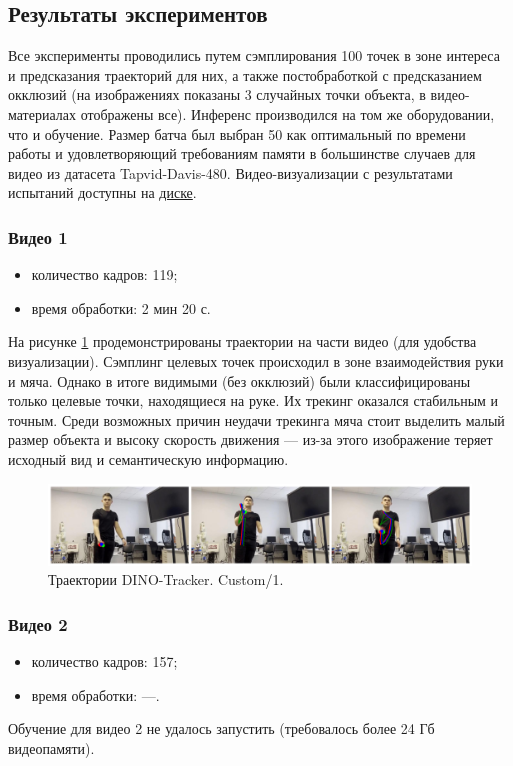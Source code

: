 \documentclass[a4paper, 14pt]{extarticle}
\theoremstyle{definition}
\theoremstyle{plain}
\theoremstyle{remark}
\begin{document}
\subsection{Результаты экспериментов}
Все эксперименты проводились путем сэмплирования 100 точек в зоне интереса и предсказания траекторий для них, а также постобработкой с предсказанием окклюзий (на изображениях показаны 3 случайных точки объекта, в видео-материалах отображены все). Инференс производился на том же оборудовании, что и обучение. Размер батча был выбран 50 как оптимальный по времени работы и удовлетворяющий требованиям памяти в большинстве случаев для видео из датасета Tapvid-Davis-480. Видео-визуализации с результатами испытаний доступны на \href{https://drive.google.com/drive/folders/1jyuXTmpgYpkRt16hLX30Lu-oDO__paxN?usp=drive_link}{диске}.

\subsubsection{Видео 1}
\begin{itemize}
	\item количество кадров: 119;
	\item время обработки: 2 мин 20 с.
\end{itemize}

На рисунке \ref{fig:custom-1} продемонстрированы траектории на части видео (для удобства визуализации). Сэмплинг целевых точек происходил в зоне взаимодействия руки и мяча. Однако в итоге видимыми (без окклюзий) были классифицированы только целевые точки, находящиеся на руке. Их трекинг оказался стабильным и точным. Среди возможных причин неудачи трекинга мяча стоит выделить малый размер объекта и высоку скорость движения --- из-за этого изображение теряет исходный вид и семантическую информацию. 
\begin{figure}
    [H]
    \centering
    \includegraphics[width=\textwidth]{figs/custom-1.png}
    \caption{Траектории DINO-Tracker. Custom/1.}
    \label{fig:custom-1}
\end{figure}

\subsubsection{Видео 2}
\begin{itemize}
	\item количество кадров: 157;
	\item время обработки: ---.
\end{itemize}
Обучение для видео 2 не удалось запустить (требовалось более 24 Гб видеопамяти).
\end{document}
